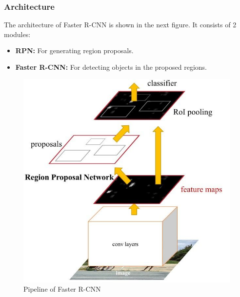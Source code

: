         \subsubsection{Architecture}
            The architecture of Faster R-CNN is shown in the next figure. It consists of 2 modules:
            \begin{itemize}
                \item \textbf{RPN:} For generating region proposals. 
                \item \textbf{Faster R-CNN:} For detecting objects in the proposed regions.
            \end{itemize}
            \begin{figure}[H]
                \centering
                \includegraphics[width=0.6\linewidth]{img/R-CNN.png}
                \caption{Pipeline of Faster R-CNN}
            \end{figure}
